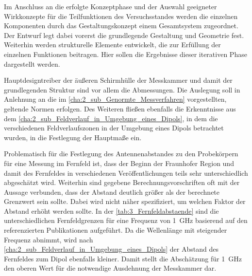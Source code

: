 

Im Anschluss an die erfolgte Konzeptphase und der Auswahl geeigneter Wirkkonzepte für die Teilfunktionen des Versuchsstandes werden die einzelnen Komponenten durch das Gestaltungskonzept einem Gesamtsystem zugeordnet. Der Entwurf legt dabei vorerst die grundlegende Gestaltung und Geometrie fest. Weiterhin werden strukturelle Elemente entwickelt, die zur Erfüllung der einzelnen Funktionen beitragen. Hier sollen die Ergebnisse dieser iterativen Phase dargestellt werden. 
\par
\vspace{\linespace}
Hauptdesigntreiber der äußeren Schirmhülle der Messkammer und damit der grundlegenden Struktur sind vor allem die Abmessungen. Die Auslegung soll in Anlehnung an die im \Abschnitt\ref{cha:2_sub_Genormte_Messverfahren} vorgestellten, geltende Normen erfolgen. Des Weiteren fließen ebenfalls die Erkenntnisse aus dem \Abschnitt\ref{cha:2_sub_Feldverlauf_in_Umgebung_eines_Dipols}, in dem die verschiedenen Feldverlaufszonen in der Umgebung eines Dipols betrachtet wurden, in die Festlegung der Hauptmaße ein.
\par
\vspace{\linespace}
Problematisch für die Festlegung des Antennenabstandes zu den Probekörpern für eine Messung im Fernfeld ist, dass der Beginn der Fraunhofer Region und damit des Fernfeldes in verschiedenen Veröffentlichungen teils sehr unterschiedlich abgeschätzt wird. Weiterhin sind gegebene Berechnungsvorschriften oft mit der Aussage verbunden, dass der Abstand deutlich größer als der berechnete Grenzwert sein sollte. Dabei wird nicht näher spezifiziert, um welchen Faktor der Abstand erhöht werden sollte. In der \Tabelle\ref{tab:3_Fernfeldabstaende} sind die unterschiedlichen Fernfeldgrenzen für eine Frequenz von \SI{1}{\giga\hertz} basierend auf den referenzierten Publikationen aufgeführt. Da die Wellenlänge mit steigender Frequenz abnimmt, wird nach \Abschnitt\ref{cha:2_sub_Feldverlauf_in_Umgebung_eines_Dipols} der Abstand des Fernfeldes zum Dipol ebenfalls kleiner. Damit stellt die Abschätzung für \SI{1}{\giga\hertz} den oberen Wert für die notwendige Ausdehnung der Messkammer dar.
\par
\vspace{\linespace}


